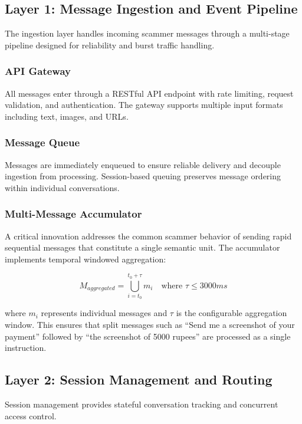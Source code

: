 \documentclass[conference]{IEEEtran}
\begin{document}
\subsection{Layer 1: Message Ingestion and Event Pipeline}

The ingestion layer handles incoming scammer messages through a multi-stage pipeline designed for reliability and burst traffic handling.

\subsubsection{API Gateway}
All messages enter through a RESTful API endpoint with rate limiting, request validation, and authentication. The gateway supports multiple input formats including text, images, and URLs.

\subsubsection{Message Queue}
Messages are immediately enqueued to ensure reliable delivery and decouple ingestion from processing. Session-based queuing preserves message ordering within individual conversations.

\subsubsection{Multi-Message Accumulator}
A critical innovation addresses the common scammer behavior of sending rapid sequential messages that constitute a single semantic unit. The accumulator implements temporal windowed aggregation:

\begin{equation}
M_{aggregated} = \bigcup_{i=t_0}^{t_0 + \tau} m_i \quad \text{where } \tau \leq 3000ms
\end{equation}

where $m_i$ represents individual messages and $\tau$ is the configurable aggregation window. This ensures that split messages such as ``Send me a screenshot of your payment'' followed by ``the screenshot of 5000 rupees'' are processed as a single instruction.

\subsection{Layer 2: Session Management and Routing}

Session management provides stateful conversation tracking and concurrent access control.
\end{document}
